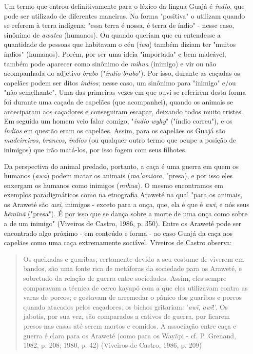 Um termo que entrou definitivamente para o léxico da língua Guajá é
\emph{índio}, que pode ser utilizado de diferentes maneiras. Na forma
"positiva" o utilizam quando se referem à terra indígena: "essa terra é
nossa, é terra de índio" - nesse caso, sinônimo de \emph{awatea}
(humanos). Ou quando queriam que eu entendesse a quantidade de pessoas
que habitavam o céu (\emph{iwa}) também diziam ter "muitos índios"
(humanos). Porém, por ser uma ideia "importada" e bem maleável, também
pode aparecer como sinônimo de \emph{mihua} (inimigo) e vir ou não
acompanhada do adjetivo \emph{brabo} ("\emph{índio} \emph{brabo}"). Por
isso, durante as caçadas os capelães podem ser ditos \emph{índios};
nesse caso, um sinônimo para "inimigo" e/ou "não-semelhante". Uma das
primeiras vezes em que ouvi se referirem desta forma foi durante uma
caçada de capelães (que acompanhei), quando os animais se anteciparam
aos caçadores e conseguiram escapar, deixando todos muito tristes. Em
seguida um homem veio falar comigo, "\emph{índio} \emph{wyhy}" ("índio
correu"), e os \emph{índios} em questão eram os capelães. Assim, para os
capelães os Guajá são \emph{madeireiros}, \emph{brancos}, \emph{índios}
(ou qualquer outro termo que ocupe a posição de inimigos) que irão
matá-los, por isso fogem com seus filhotes.

Da perspectiva do animal predado, portanto, a caça é uma guerra em quem
os humanos (\emph{awa}) podem matar os animais (\emph{ma'amiara},
"presa), e por isso eles enxergam os humanos como inimigos
(\emph{mihua}). O mesmo encontramos em exemplos paradigmáticos como na
etnografia Araweté na qual "para os animais, os Araweté são \emph{awĩ},
inimigos - exceto para a onça, que, ela é que é \emph{awĩ}, e nós seus
\emph{hẽmĩnã} ("presa"). É por isso que se dança sobre a morte de uma
onça como sobre a de um inimigo" (Viveiros de Castro, 1986, p. 350).
Entre os Araweté pode ser encontrado algo próximo - em conteúdo e forma
- ao caso Guajá da caça aos capelães como uma caça extremamente
sociável. Viveiros de Castro observa:

\begin{quote}
Os queixadas e guaribas, certamente devido a seu costume de viverem em
bandos, são uma fonte rica de metáforas da sociedade para os Araweté, e
sobretudo da relação de guerra entre sociedades. Assim, eles sempre
comparavam a técnica de cerco kayapó com a que eles utilizavam contra as
varas de porcos; e gostavam de arremedar o pânico dos guaribas e porcos
quando atacados pelos caçadores; os bichos gritariam: '\emph{awĩ},
\emph{awĩ}!'. Os jabotis, por sua vez, são comparados a cativos de
guerra, por ficarem presos nas casas até serem mortos e comidos. A
associação entre caça e guerra é clara para os Araweté (como para os
Wayãpi - cf. P. Grenand, 1982, p. 208; 1980, p. 42) (Viveiros de Castro,
1986, p. 209)
\end{quote}

